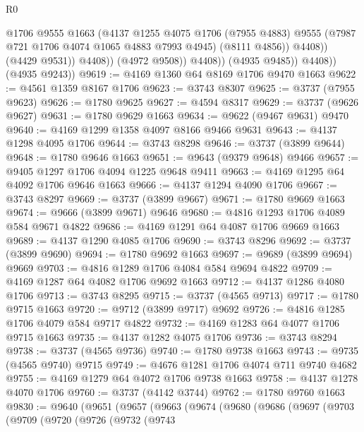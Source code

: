 \begin{lexlean}{R0}
\begin{coremodule}
                            @1706
                            @9555
                            @1663
                            (@4137
                              @1255
                              @4075
                              @1706
                              (@7955 @4883)
                              @9555
                              (@7987 @721 @1706 @4074 @1065 @4883 @7993 @4945)
                              (@8111 @4856))
                            @4408))
                        (@4429 @9531))
                      @4408))
                  (@4972 @9508))
                @4408))
            (@4935 @9485))
          @4408))
      (@4935 @9243))
@9619 := @4169 @1360 @64 @8169 @1706 @9470 @1663
@9622 := @4561 @1359 @8167 @1706
@9623 := @3743 @8307
@9625 := @3737 (@7955 @9623)
@9626 := @1780 @9625
@9627 := @4594 @8317
@9629 := @3737 (@9626 @9627)
@9631 := @1780 @9629 @1663
@9634 := @9622 (@9467 @9631) @9470
@9640 := @4169 @1299 @1358 @4097 @8166 @9466 @9631
@9643 := @4137 @1298 @4095 @1706
@9644 := @3743 @8298
@9646 := @3737 (@3899 @9644)
@9648 := @1780 @9646 @1663
@9651 := @9643 (@9379 @9648) @9466
@9657 := @9405 @1297 @1706 @4094 @1225 @9648 @9411
@9663 := @4169 @1295 @64 @4092 @1706 @9646 @1663
@9666 := @4137 @1294 @4090 @1706
@9667 := @3743 @8297
@9669 := @3737 (@3899 @9667)
@9671 := @1780 @9669 @1663
@9674 := @9666 (@3899 @9671) @9646
@9680 := @4816 @1293 @1706 @4089 @584 @9671 @4822
@9686 := @4169 @1291 @64 @4087 @1706 @9669 @1663
@9689 := @4137 @1290 @4085 @1706
@9690 := @3743 @8296
@9692 := @3737 (@3899 @9690)
@9694 := @1780 @9692 @1663
@9697 := @9689 (@3899 @9694) @9669
@9703 := @4816 @1289 @1706 @4084 @584 @9694 @4822
@9709 := @4169 @1287 @64 @4082 @1706 @9692 @1663
@9712 := @4137 @1286 @4080 @1706
@9713 := @3743 @8295
@9715 := @3737 (@4565 @9713)
@9717 := @1780 @9715 @1663
@9720 := @9712 (@3899 @9717) @9692
@9726 := @4816 @1285 @1706 @4079 @584 @9717 @4822
@9732 := @4169 @1283 @64 @4077 @1706 @9715 @1663
@9735 := @4137 @1282 @4075 @1706
@9736 := @3743 @8294
@9738 := @3737 (@4565 @9736)
@9740 := @1780 @9738 @1663
@9743 := @9735 (@4565 @9740) @9715
@9749 := @4676 @1281 @1706 @4074 @711 @9740 @4682
@9755 := @4169 @1279 @64 @4072 @1706 @9738 @1663
@9758 := @4137 @1278 @4070 @1706
@9760 := @3737 (@4142 @3744)
@9762 := @1780 @9760 @1663
@9830 := @9640
    (@9651
      (@9657
        (@9663
          (@9674
            (@9680
              (@9686
                (@9697
                  (@9703
                    (@9709
                      (@9720
                        (@9726
                          (@9732
                            (@9743

\end{coremodule}
\end{lexlean}
